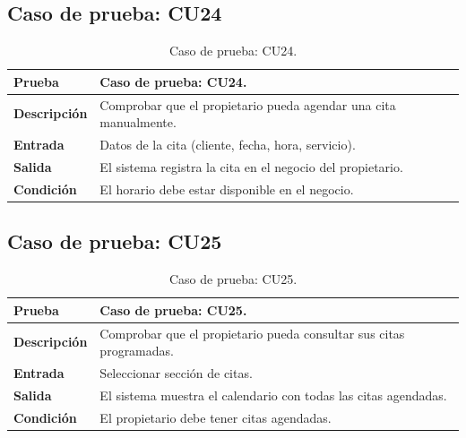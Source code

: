 
\subsection{Caso de prueba: CU24}

\begin{table}[ht]
\centering
\renewcommand{\arraystretch}{1.3}
\begin{tabular}{|p{3cm}|p{12cm}|}
\hline
\rowcolor[RGB]{191,191,191}
\textbf{Prueba} & Caso de prueba: CU24. \\
\hline
\textbf{Descripción} \cellcolor[RGB]{217,217,217} & Comprobar que el propietario pueda agendar una cita manualmente. \\
\hline
\textbf{Entrada} \cellcolor[RGB]{217,217,217} & Datos de la cita (cliente, fecha, hora, servicio). \\
\hline
\textbf{Salida} \cellcolor[RGB]{217,217,217} & El sistema registra la cita en el negocio del propietario. \\
\hline
\textbf{Condición} \cellcolor[RGB]{217,217,217} & El horario debe estar disponible en el negocio. \\
\hline
\end{tabular}
\caption{Caso de prueba: CU24.}
\label{tab:cu24_black_test}
\end{table}


\subsection{Caso de prueba: CU25}

\begin{table}[ht]
\centering
\renewcommand{\arraystretch}{1.3}
\begin{tabular}{|p{3cm}|p{12cm}|}
\hline
\rowcolor[RGB]{191,191,191}
\textbf{Prueba} & Caso de prueba: CU25. \\
\hline
\textbf{Descripción} \cellcolor[RGB]{217,217,217} & Comprobar que el propietario pueda consultar sus citas programadas. \\
\hline
\textbf{Entrada} \cellcolor[RGB]{217,217,217} & Seleccionar sección de citas. \\
\hline
\textbf{Salida} \cellcolor[RGB]{217,217,217} & El sistema muestra el calendario con todas las citas agendadas. \\
\hline
\textbf{Condición} \cellcolor[RGB]{217,217,217} & El propietario debe tener citas agendadas. \\
\hline
\end{tabular}
\caption{Caso de prueba: CU25.}
\label{tab:cu25_black_test}
\end{table}

